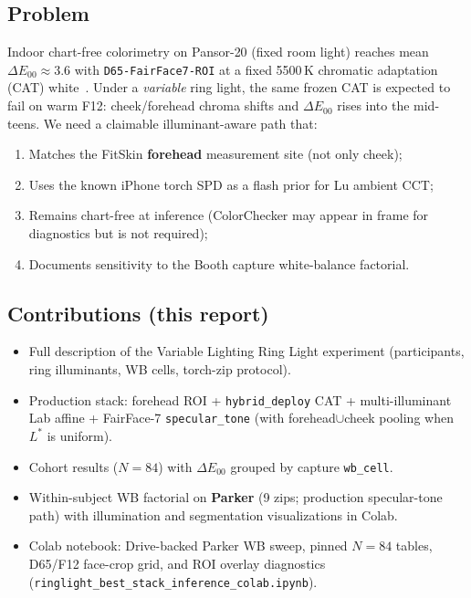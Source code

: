 \documentclass[11pt]{article}
\newcommand{\deee}{\ensuremath{\Delta E_{00}}}
\newcommand{\pipename}{\texttt{D65-FairFace7-ROI}}
\begin{document}
\subsection{Problem}
Indoor chart-free colorimetry on Pansor-20 (fixed room light) reaches mean
$\deee\approx\num{3.6}$ with \pipename{} at a fixed 5500\,K chromatic adaptation
(CAT) white~\cite{placeholder-d65-roi}.
Under a \emph{variable} ring light, the same frozen CAT is expected to fail on
warm F12: cheek/forehead chroma shifts and $\deee$ rises into the mid-teens.
We need a claimable illuminant-aware path that:
\begin{enumerate}[leftmargin=*]
  \item Matches the FitSkin \textbf{forehead} measurement site (not only cheek);
  \item Uses the known iPhone torch SPD as a flash prior for Lu ambient CCT;
  \item Remains chart-free at inference (ColorChecker may appear in frame for
        diagnostics but is not required);
  \item Documents sensitivity to the Booth capture white-balance factorial.
\end{enumerate}

\subsection{Contributions (this report)}
\begin{itemize}[leftmargin=*]
  \item Full description of the Variable Lighting Ring Light experiment
        (participants, ring illuminants, WB cells, torch-zip protocol).
  \item Production stack: forehead ROI + \texttt{hybrid\_deploy} CAT +
        multi-illuminant Lab affine + FairFace-7 \texttt{specular\_tone}
        (with forehead$\cup$cheek pooling when $L^*$ is uniform).
  \item Cohort results ($N=84$) with $\deee$ grouped by capture \texttt{wb\_cell}.
  \item Within-subject WB factorial on \textbf{Parker} (9 zips; production
        specular-tone path) with illumination and segmentation visualizations
        in Colab.
  \item Colab notebook: Drive-backed Parker WB sweep, pinned $N=84$ tables,
        D65/F12 face-crop grid, and ROI overlay diagnostics
        (\texttt{ringlight\_best\_stack\_inference\_colab.ipynb}).
\end{itemize}
\end{document}

